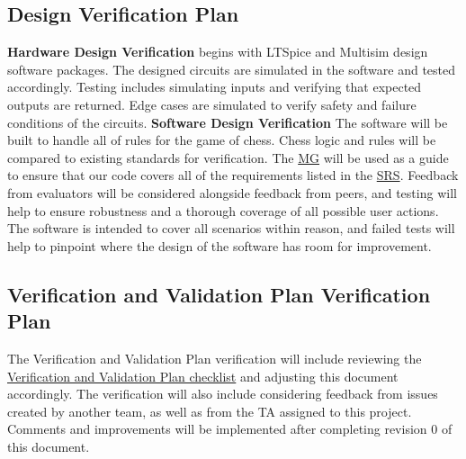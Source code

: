 \documentclass[12pt, titlepage]{article}
\begin{document}

\subsection{Design Verification Plan}
\textbf{Hardware Design Verification} begins with LTSpice and Multisim design software
packages. The designed circuits are simulated in the software and tested accordingly.
Testing includes simulating inputs and verifying that expected outputs are returned. 
Edge cases are simulated to verify safety and failure conditions of the circuits. 
\newline
\newline
\textbf{Software Design Verification} The software will be built to handle all of rules for
the game of chess. Chess logic and rules will be compared to existing standards for verification.
The \href{file:../Design/SoftArchitecture/MG.pdf}{MG} will be used as a guide to ensure that our
code covers all of the requirements listed in the \href{file:../SRS/SRS.pdf}{SRS}. Feedback from
evaluators will be considered alongside feedback from peers, and testing will help to ensure robustness
and a thorough coverage of all possible user actions. The software is intended to cover all scenarios
within reason, and failed tests will help to pinpoint where the design of the software has room for
improvement.

\subsection{Verification and Validation Plan Verification Plan}

The Verification and Validation Plan verification will include reviewing the 
\href{file:../Checklists/VnV-Checklist.pdf}{Verification and Validation Plan checklist} and adjusting this document accordingly. 
The verification will also include considering feedback from issues created by another team, as well as from the TA assigned to this project. 
Comments and improvements will be implemented after completing revision 0 of this document.
\end{document}
